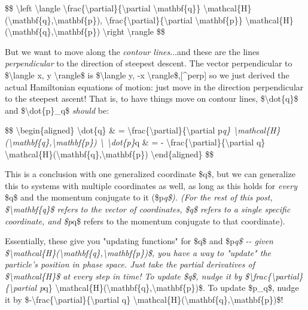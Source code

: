 \documentclass[]{article}
\begin{document}
\$\$ \textbackslash{}left \textbackslash{}langle
\textbackslash{}frac\{\textbackslash{}partial\}\{\textbackslash{}partial
\textbackslash{}mathbf\{q\}\}
\textbackslash{}mathcal\{H\}(\textbackslash{}mathbf\{q\},\textbackslash{}mathbf\{p\}),
\textbackslash{}frac\{\textbackslash{}partial\}\{\textbackslash{}partial
\textbackslash{}mathbf\{p\}\}
\textbackslash{}mathcal\{H\}(\textbackslash{}mathbf\{q\},\textbackslash{}mathbf\{p\})
\textbackslash{}right \textbackslash{}rangle \$\$

But we want to move along the \emph{contour lines}...and these are the lines
\emph{perpendicular} to the direction of steepest descent. The vector
perpendicular to \$\textbackslash{}langle x, y \textbackslash{}rangle\$ is
\$\textbackslash{}langle y, -x \textbackslash{}rangle\$,{[}\^{}perp{]} so we
just derived the actual Hamiltonian equations of motion: just move in the
direction perpendicular to the steepest ascent! That is, to have things move on
contour lines, \$\textbackslash{}dot\{q\}\$ and \$\textbackslash{}dot\{p\}\_q\$
\emph{should} be:

\$\$ \textbackslash{}begin\{aligned\} \textbackslash{}dot\{q\} \& =
\textbackslash{}frac\{\textbackslash{}partial\}\{\textbackslash{}partial
p\emph{q\}
\textbackslash{}mathcal\{H\}(\textbackslash{}mathbf\{q\},\textbackslash{}mathbf\{p\})
\textbackslash{} \textbackslash{}dot\{p\}}q \& = -
\textbackslash{}frac\{\textbackslash{}partial\}\{\textbackslash{}partial q\}
\textbackslash{}mathcal\{H\}(\textbackslash{}mathbf\{q\},\textbackslash{}mathbf\{p\})
\textbackslash{}end\{aligned\} \$\$

This is a conclusion with one generalized coordinate \$q\$, but we can
generalize this to systems with multiple coordinates as well, as long as this
holds for \emph{every} \$q\$ and the momentum conjugate to it (\$p\emph{q\$).
(For the rest of this post, \$\textbackslash{}mathbf\{q\}\$ refers to the vector
of coordinates, \$q\$ refers to a single specific coordinate, and \$p}q\$ refers
to the momentum conjugate to that coordinate).

Essentially, these give you "updating functions" for \$q\$ and \$p\emph{q\$ -\/-
given
\$\textbackslash{}mathcal\{H\}(\textbackslash{}mathbf\{q\},\textbackslash{}mathbf\{p\})\$,
you have a way to "update" the particle's position in phase space. Just take the
partial derivatives of \$\textbackslash{}mathcal\{H\}\$ at every step in time!
To update \$q\$, nudge it by
\$\textbackslash{}frac\{\textbackslash{}partial\}\{\textbackslash{}partial p}q\}
\textbackslash{}mathcal\{H\}(\textbackslash{}mathbf\{q\},\textbackslash{}mathbf\{p\})\$.
To update \$p\_q\$, nudge it by
\$-\textbackslash{}frac\{\textbackslash{}partial\}\{\textbackslash{}partial q\}
\textbackslash{}mathcal\{H\}(\textbackslash{}mathbf\{q\},\textbackslash{}mathbf\{p\})\$!
\end{document}
